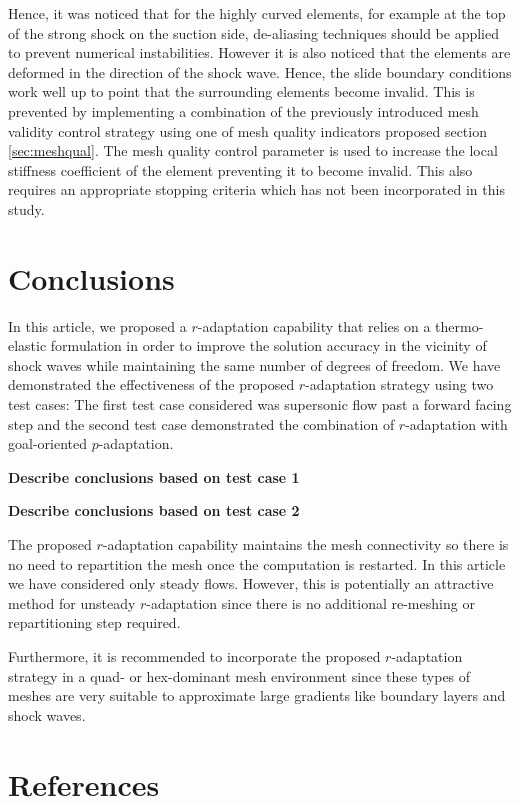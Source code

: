 \documentclass[review]{elsarticle}
\begin{document}
Hence, it was noticed that for the highly curved elements, for example at the top of the strong shock on the suction side, de-aliasing techniques should be applied to prevent numerical instabilities.
However it is also noticed that the elements are deformed in the direction of the shock wave.
Hence, the slide boundary conditions work well up to point that the surrounding elements become invalid.
This is prevented by implementing a combination of the previously introduced mesh validity control strategy using one of mesh quality indicators proposed section \ref{sec:meshqual}. 
The mesh quality control parameter is used to increase the local stiffness coefficient of the element preventing it to become invalid.
This also requires an appropriate stopping criteria which has not been incorporated in this study.
\section{Conclusions}
In this article, we proposed a $r$-adaptation capability that relies on a thermo-elastic formulation in order to improve the solution accuracy in the vicinity of shock waves while maintaining the same number of degrees of freedom. We have demonstrated the effectiveness of the proposed $r$-adaptation strategy using two test cases: The first test case considered was supersonic flow past a forward facing step and the second test case demonstrated the combination of $r$-adaptation with goal-oriented $p$-adaptation.
\par {\bf Describe conclusions based on test case 1}
\par {\bf Describe conclusions based on test case 2}
\par The proposed $r$-adaptation capability maintains the mesh connectivity so there is no need to repartition the mesh once the computation is restarted. In this article we have considered only steady flows.	However, this is potentially an attractive method for unsteady $r$-adaptation since there is no additional re-meshing or repartitioning step required.
\par Furthermore, it is recommended to incorporate the proposed $r$-adaptation strategy in a quad- or hex-dominant mesh environment since these types of meshes are very suitable to approximate large gradients like boundary layers and shock waves.
\section*{References}


\end{document}

